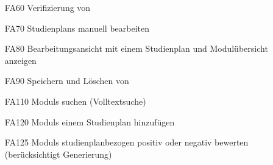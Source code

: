 \begin{itemize}[nosep]
\begin{itemize}[nosep]
				\item \glspl{Nutzer-Zielfunktion}
				\begin{itemize}[nosep]
					\item \gls{ECTS-Punkte}-Minimierung
					\item möglichst schneller Studienabschluss
				\end{itemize}
			\end{itemize}
		\item [FA60] \gls{Verifizierung} von 
		\item [FA70] \glspl{Studienplan} manuell bearbeiten
		\item[FA80] Bearbeitungsansicht mit einem \gls{Studienplan} und Modulübersicht anzeigen  
		\item [FA90]Speichern und Löschen von 	
		\item[FA110] \glspl{Modul} suchen (Volltextsuche)
		\item[FA120] \glspl{Modul} einem \gls{Studienplan} hinzufügen
		\item[FA125] \glspl{Modul} studienplanbezogen positiv oder negativ bewerten (berücksichtigt \gls{Generierung})
		\end{itemize}

